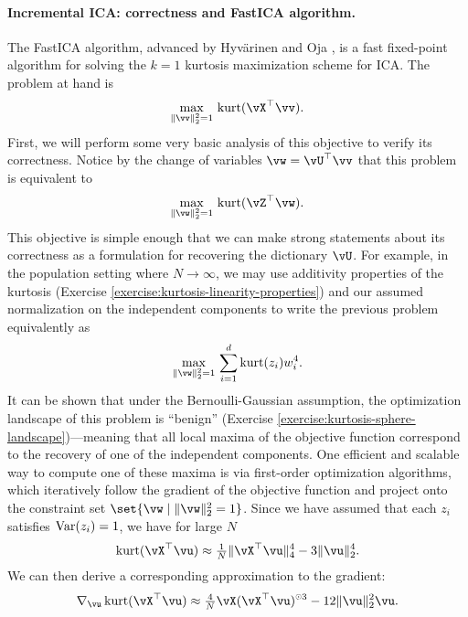 \documentclass[../../book-main.tex]{subfiles}
\begin{document}
\paragraph{Incremental ICA: correctness and FastICA algorithm.}
The FastICA algorithm, advanced by Hyv\"{a}rinen and Oja \cite{hyvarinen-1997}, is a fast fixed-point algorithm for solving the $k=1$ kurtosis maximization scheme for ICA.
The problem at hand is
\begin{equation}\label{eq:kurtosis-maximization-sphere-finitesample}
    \max_{\norm{\vv}_2^2 = 1}\, \kurt(\vX^\top \vv).
\end{equation}
First, we will perform some very basic analysis of this objective to verify its correctness. Notice by the change of variables $\vw = \vU^\top \vv$ that this problem is equivalent to
\begin{equation*}
    \max_{\norm{\vw}_2^2 = 1}\, 
    \mathrm{kurt}(\vZ^\top \vw).
\end{equation*}
This objective is simple enough that we can make strong statements about its correctness as a formulation for recovering the dictionary $\vU$.
For example, in the population setting where $N \to \infty$, 
we may use additivity properties of the kurtosis (Exercise \ref{exercise:kurtosis-linearity-properties}) and our assumed normalization on the independent components to write the previous problem equivalently as
\begin{equation}\label{eq:kurtosis-maximization-sphere-population-simple}
    \max_{\norm{\vw}_2^2 = 1}\, 
    \sum_{i=1}^d \mathrm{kurt}(z_i) w_i^4.
\end{equation}
It can be shown that under the Bernoulli-Gaussian assumption, the optimization landscape of this problem is ``benign'' (Exercise \ref{exercise:kurtosis-sphere-landscape})---meaning that all local maxima of the objective function correspond to the recovery of one of the independent components.
One efficient and scalable way to compute one of these maxima is via first-order optimization algorithms, which iteratively follow the gradient of the objective function and project onto the constraint set $\set{\vw \given \norm{\vw}_2^2 = 1}$.
Since we have assumed that each $z_i$ satisfies $\operatorname{Var}(z_i)=1$, we 
have for large $N$
\begin{equation}\label{eq:kurtosis-approximation-l4}
    \kurt(\vX^\top \vu)
    \approx
    \tfrac{1}{N} \norm{\vX^\top \vu}_4^4 - 3 \norm{\vu}_2^4.
\end{equation}
We can then derive a corresponding approximation to the gradient:
\begin{equation*}
    \nabla_{\vu} \kurt(\vX^\top \vu)
    \approx
    \tfrac{4}{N} \vX (\vX^\top \vu)^{\hada 3}
    - 12 \norm{\vu}_2^2 \vu.
\end{equation*}
\end{document}
